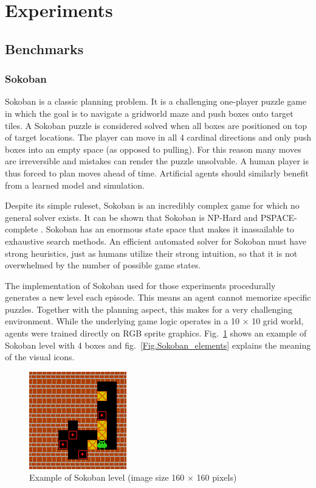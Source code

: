 \section{Experiments}

\subsection{Benchmarks}

\subsubsection{Sokoban}

Sokoban is a classic planning problem. It is a challenging one-player puzzle game in which the goal is to navigate a gridworld maze and push boxes onto target tiles. A Sokoban puzzle is considered solved when all boxes are positioned on top of target locations. The player can move in all 4 cardinal directions and only push boxes into an empty space (as opposed to pulling). For this reason many moves are irreversible and mistakes can render the puzzle unsolvable. A human player is thus forced to plan moves ahead of time. Artificial agents should similarly benefit from a learned model and simulation.

Despite its simple ruleset, Sokoban is an incredibly complex game for which no general solver exists. It can be shown that Sokoban is NP-Hard and PSPACE-complete\cite{Theory.Sokoban} . Sokoban has an enormous state space that makes it inassailable to exhaustive search methods. An efficient automated solver for Sokoban must have strong heuristics, just as humans utilize their strong intuition, so that it is not overwhelmed by the number of possible game states.

The implementation of Sokoban\cite{Code.Sokoban} used for those experiments procedurally generates a new level each episode. This means an agent cannot memorize specific puzzles. Together with the planning aspect, this makes for a very challenging environment. While the underlying game logic operates in a 10 × 10 grid world, agents were trained directly on RGB sprite graphics. Fig.~\ref{Fig.Sokoban} shows an example of Sokoban level with 4 boxes and fig.~\ref{Fig.Sokoban_elements} explains the meaning of the visual icons.

\begin{figure}[H]
\includegraphics[]{figures/Sokoban.png}
\caption[Sokoban]{Example of Sokoban level (image size 160 × 160 pixels)}
\label{Fig.Sokoban}
\end{figure}

